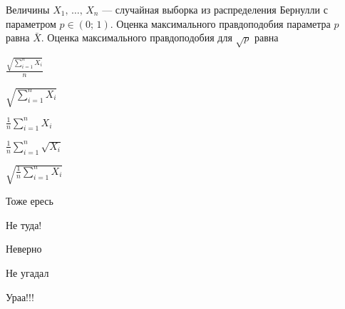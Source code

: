 
\begin{question}
Величины \(X_1, \, \ldots, \, X_n\) — случайная выборка из
распределения Бернулли с параметром \(p \in (0;\,1)\). Оценка
максимального правдоподобия параметра \(p\) равна \(\bar X\). Оценка
максимального правдоподобия для \(\sqrt{p}\) равна
\begin{answerlist}
  \item \(\frac{\sqrt{\sum_{i=1}^{n}X_i}}{n}\)
  \item \(\sqrt{\sum_{i=1}^{n}X_i}\)
  \item \(\frac{1}{n}\sum_{i=1}^{n}X_i\)
  \item \(\frac{1}{n}\sum_{i=1}^{n}\sqrt{X_i}\)
  \item \(\sqrt{\frac{1}{n}\sum_{i=1}^{n}X_i}\)
\end{answerlist}
\end{question}

\begin{solution}
\begin{answerlist}
  \item Тоже ересь
  \item Не туда!
  \item Неверно
  \item Не угадал
  \item Ураа!!!
\end{answerlist}
\end{solution}

